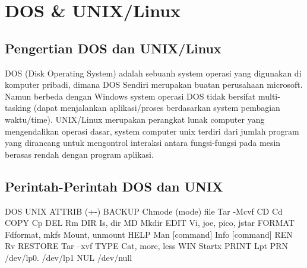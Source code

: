 \section {DOS & UNIX/Linux}
\subsection{Pengertian DOS dan UNIX/Linux}
DOS (Disk Operating System) adalah sebuanh system operasi yang digunakan di komputer pribadi, dimana DOS Sendiri merupakan buatan perusahaan microsoft. Namun berbeda dengan Windows system operasi DOS tidak bersifat multi-tasking (dapat menjalankan aplikasi/proses berdasarkan system pembagian waktu/time).
UNIX/Linux merupakan perangkat lunak computer yang mengendalikan operasi dasar, system computer unix terdiri dari jumlah program yang dirancang untuk mengontrol interaksi antara fungsi-fungsi pada mesin berasas rendah dengan program aplikasi.
\subsection{Perintah-Perintah DOS dan UNIX}
DOS	UNIX
ATTRIB (+-)
BACKUP	Chmode (mode) file
Tar -Mcvf
CD	Cd
COPY	Cp
DEL	Rm
DIR	Is, dir
MD	Mkdir
EDIT	Vi, joe, pico, jstar
FORMAT	Fdformat, mkfs
Mount, unmount
HELP	Man [command]
Info [command]
REN	Rv
RESTORE	Tar –xvf
TYPE	Cat, more, less
WIN	Startx
PRINT	Lpt
PRN	/dev/lp0. /dev/lp1
NUL	/dev/null